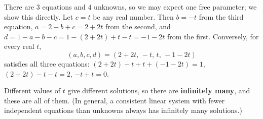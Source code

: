 There are $3$ equations and $4$ unknowns, so we may expect one free parameter; we show this directly. Let $c=t$ be any real number. Then $b=-t$ from the third equation, $a=2-b+c=2+2t$ from the second, and $d=1-a-b-c=1-(2+2t)+t-t=-1-2t$ from the first. Conversely, for every real $t$,
\[(a,b,c,d)=(2+2t,\,-t,\,t,\,-1-2t)\]
satisfies all three equations: $(2+2t)-t+t+(-1-2t)=1$, $(2+2t)-t-t=2$, $-t+t=0$.

Different values of $t$ give different solutions, so there are \textbf{infinitely many}, and these are all of them. (In general, a consistent linear system with fewer independent equations than unknowns always has infinitely many solutions.)
